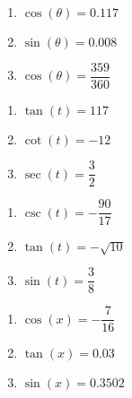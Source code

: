 \documentclass{ximera}
\begin{document}
\begin{multicols}{3}

\begin{enumerate}

\setcounter{enumi}{\value{HW}}

\item $\cos(\theta) = 0.117$ 
\item $\sin(\theta) = 0.008$ 
\item $\cos(\theta) = \dfrac{359}{360}$

\setcounter{HW}{\value{enumi}}

\end{enumerate}

\end{multicols}

\begin{multicols}{3}

\begin{enumerate}

\setcounter{enumi}{\value{HW}}

\item $\tan(t) = 117$ 
\item $\cot(t) = -12$ 
\item $\sec(t) = \dfrac{3}{2}$

\setcounter{HW}{\value{enumi}}

\end{enumerate}

\end{multicols}

\begin{multicols}{3}

\begin{enumerate}

\setcounter{enumi}{\value{HW}}

\item $\csc(t) = -\dfrac{90}{17}$
\item $\tan(t) = -\sqrt{10}$ 
\item $\sin(t) = \dfrac{3}{8}$

\setcounter{HW}{\value{enumi}}

\end{enumerate}

\end{multicols}

\begin{multicols}{3}

\begin{enumerate}

\setcounter{enumi}{\value{HW}}

\item $\cos(x) = -\dfrac{7}{16}$
\item $\tan(x) = 0.03$ 
\item $\sin(x) = 0.3502$ 

\setcounter{HW}{\value{enumi}}

\end{enumerate}

\end{multicols}
\end{document}
